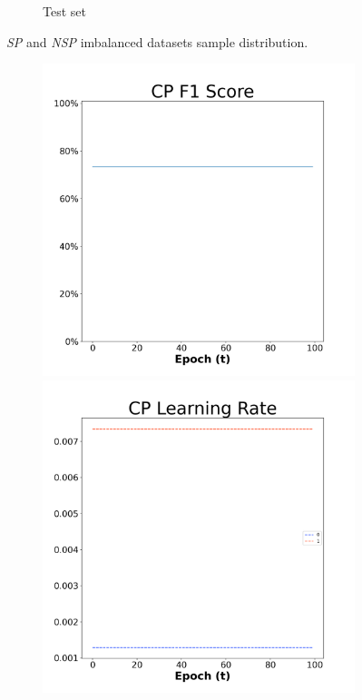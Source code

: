 \begin{figure}[H]
\begin{subfigure}[t]{0.45\textwidth}
        \caption{Test set}
    \end{subfigure}
    \caption{\textit{SP} and \textit{NSP} imbalanced datasets sample distribution.}
\end{figure}

\begin{figure}[H]
    \centering %
\begin{subfigure}{0.3\textwidth}
  \includegraphics[width=\linewidth]{images/exper2/SP/CP_0.01_f1.png}
    \includegraphics[width=\linewidth]{images/exper2/SP/CP_0.01_lr.png}

\end{subfigure}
\end{figure}
